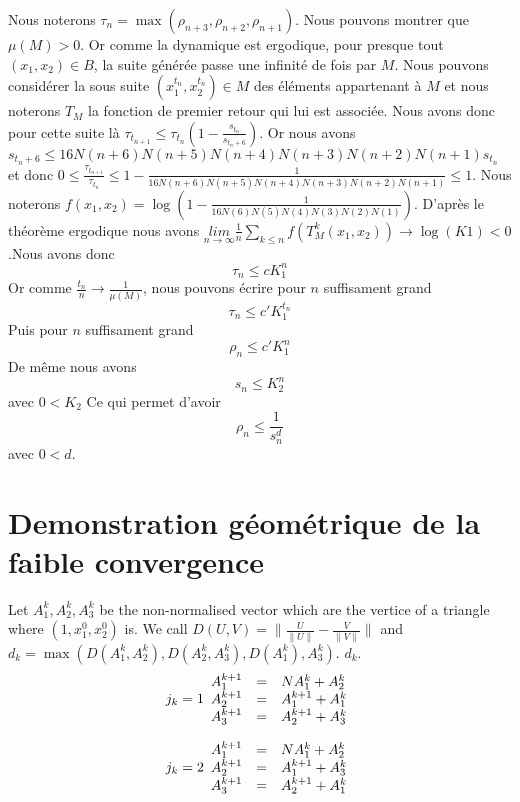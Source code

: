 \documentclass[12pt]{article}
\theoremstyle{plain}%
\theoremstyle{definition}
\theoremstyle{remark}
\begin{document}
Nous noterons $\tau_n=\max{(\rho_{n+3},\rho_{n+2},\rho_{n+1})}$.\newline
Nous pouvons montrer que $\mu(M)>0$. Or comme la dynamique est ergodique, pour presque tout $(x_1,x_2) \in B$, la suite générée passe une infinité de fois par $M$. Nous pouvons considérer la sous suite $(x_1^{t_n},x_2^{t_n})\in M$ des éléments appartenant à $M$ et nous noterons $T_M$ la fonction de premier retour qui lui est associée. Nous avons donc pour cette suite là $\tau_{t_{n+1}} \leq \tau_{t_{n}}(1-\frac{s_{t_n}}{s_{t_n+6}})$. \newline
Or nous avons $s_{t_n+6} \leq 16 N(n+6)N(n+5)N(n+4)N(n+3)N(n+2)N(n+1)s_{t_n}$ et donc $0 \leq \frac{\tau_{t_{n+1}}}{\tau_{t_{n}}} \leq 1-\frac{1}{16 N(n+6)N(n+5)N(n+4)N(n+3)N(n+2)N(n+1)} \leq 1$. Nous noterons $f(x_1,x_2)=\log(1-\frac{1}{16 N(6)N(5)N(4)N(3)N(2)N(1)})$.
D'après le théorème ergodique nous avons $\underset{n \to \infty}{lim}\frac{1}{n}\sum_{k \leq n}f(T_M^k(x_1,x_2)) \to \log(K1) <0$.Nous avons donc\[
\tau_n \leq c K_1^{n}
\]
Or comme $\frac{t_n}{n} \to \frac{1}{\mu(M)}$, nous pouvons écrire pour $n$ suffisament grand\[
\tau_n \leq c' K_1^{t_n}
\]
Puis pour $n$ suffisament grand\[
\rho_n \leq c' K_1^n
\]
De même nous avons\[
s_n \leq K_2^n
\]
avec $0<K_2$ Ce qui permet d'avoir \[
\rho_n \leq \frac{1}{s_n^d}
\]avec $0<d$.

\section{Demonstration géométrique de la faible convergence}

Let $A_1^k,A_2^k,A_3^k$ be the non-normalised vector which are the vertice of a triangle where $(1,x_1^0,x_2^0)$ is. \newline
We call $D(U,V)=\|\frac{U}{\|U \|}- \frac{V}{\|V\|}\|$ and $d_k=\max(D(A_1^k,A_2^k),D(A_2^k,A_3^k),D(A_1^k),A_3^k)$. $d_k$.
\[j_k=1
\begin{array}{c c l}
A_1^{k+1} & = & N A_1^k+A_2^k\\
A_2^{k+1} & = & A_1^{k+1} + A_1^k \\
A_3^{k+1} & = & A_2^{k+1} + A_3^k
\end{array}
\]

\[j_k=2
\begin{array}{c c l}
A_1^{k+1} & = & N A_1^k+A_2^k\\
A_2^{k+1} & = & A_1^{k+1} + A_3^k \\
A_3^{k+1} & = & A_2^{k+1} + A_1^k
\end{array}
\]
\end{document}
